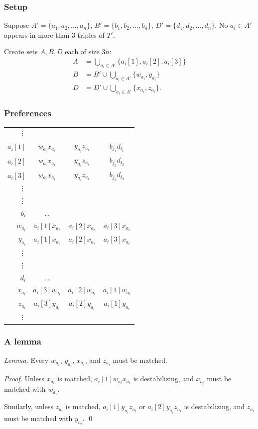 \documentclass[mathserif,serif]{beamer}
\begin{document}
\begin{frame}
	\frametitle{Setup}

	Suppose $A' = \{a_1, a_2, \dots, a_n\}$, $B' = \{b_1, b_2, \dots, b_n\}$, $D' = \{d_1, d_2, \dots, d_n\}$.  No
	$a_i \in A'$ appears in more than 3 triples of $T'$.

	Create sets $A, B, D$ each of size $3n$:
	\begin{align*}
	A &= \bigcup_{a_i \in A'} \{a_i[1], a_i[2], a_i[3]\} \\
	B &= B' \cup \bigcup_{a_i \in A'} \{w_{a_i}, y_{a_i}\} \\
	D &= D' \cup \bigcup_{a_i \in A'} \{x_{a_i}, z_{a_i}\}.
	\end{align*}
\end{frame}

\begin{frame}
	\frametitle{Preferences}

	\begin{tabular}{r | c c c}
		\vdots \\
		$a_i[1]$ &	$w_{a_i}x_{a_i}$ &	$y_{a_i}z_{a_i}$ &	$b_{j_1}d_{l_1}$ \\
		$a_i[2]$ &	$w_{a_i}x_{a_i}$ &	$y_{a_i}z_{a_i}$ &	$b_{j_2}d_{l_2}$ \\
		$a_i[3]$ &	$w_{a_i}x_{a_i}$ &	$y_{a_i}z_{a_i}$ &	$b_{j_3}d_{l_3}$ \\
		\vdots \\
		\hline
		\vdots \\
		$b_i$ &		\dots \\
		$w_{a_i}$ &	$a_i[1]x_{a_i}$ &	$a_i[2]x_{a_i}$ &	$a_i[3]x_{a_i}$ \\
		$y_{a_i}$ &	$a_i[1]x_{a_i}$ &	$a_i[2]x_{a_i}$ &	$a_i[3]x_{a_i}$ \\
		\vdots \\
		\hline
		\vdots \\
		$d_i$ &		\dots \\
		$x_{a_i}$ &	$a_i[3]w_{a_i}$ &	$a_i[2]w_{a_i}$ &	$a_i[1]w_{a_i}$ \\
		$z_{a_i}$ &	$a_i[3]y_{a_i}$ &	$a_i[2]y_{a_i}$ &	$a_i[1]y_{a_i}$ \\
		\vdots \\
	\end{tabular}
\end{frame}

\begin{frame}
	\frametitle{A lemma}

	\emph{Lemma.}
	Every $w_{a_i}$, $y_{a_i}$, $x_{a_i}$, and $z_{a_i}$ must be matched.

	\emph{Proof.}
	Unless $x_{a_i}$ is matched, $a_i[1]w_{a_i}x_{a_i}$ is destabilizing, and $x_{a_i}$ must be matched with
	$w_{a_i}$.

	Similarly, unless $z_{a_i}$ is matched, $a_i[1]y_{a_i}z_{a_i}$ or $a_i[2]y_{a_i}z_{a_i}$ is destabilizing, and
	$z_{a_i}$ must be matched with $y_{a_i}$.
	\qed
\end{frame}
\end{document}
